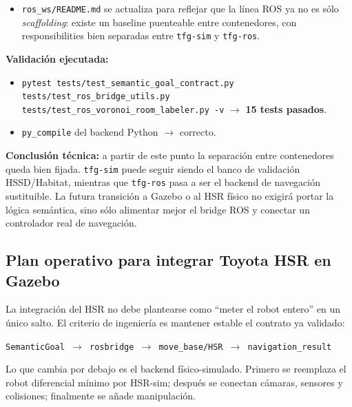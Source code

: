 \documentclass[11pt,a4paper]{article}
\begin{document}
\begin{itemize}
\begin{itemize}
                \texttt{PoseStamped};
          \item la cancelación genera el \texttt{GoalID} esperado;
          \item los resultados JSON y los resultados compatibles con
                \texttt{move\_base} se traducen al contrato
                \texttt{NavigationResult}.
        \end{itemize}
  \item \texttt{ros\_ws/README.md} se actualiza para reflejar que la línea ROS
        ya no es sólo \emph{scaffolding}: existe un baseline puenteable entre
        contenedores, con responsibilities bien separadas entre
        \texttt{tfg-sim} y \texttt{tfg-ros}.
\end{itemize}

\textbf{Validación ejecutada:}
\begin{itemize}
  \item \texttt{pytest tests/test\_semantic\_goal\_contract.py
        tests/test\_ros\_bridge\_utils.py
        tests/test\_ros\_voronoi\_room\_labeler.py -v}
        $\rightarrow$ \textbf{15 tests pasados}.
  \item \texttt{py\_compile} del backend Python $\rightarrow$ correcto.
\end{itemize}

\textbf{Conclusión técnica:} a partir de este punto la separación entre
contenedores queda bien fijada. \texttt{tfg-sim} puede seguir siendo el banco
de validación HSSD/Habitat, mientras que \texttt{tfg-ros} pasa a ser el backend
de navegación sustituible. La futura transición a Gazebo o al HSR físico no
exigirá portar la lógica semántica, sino sólo alimentar mejor el bridge ROS y
conectar un controlador real de navegación.

\subsection*{Plan operativo para integrar Toyota HSR en Gazebo}

La integración del HSR no debe plantearse como ``meter el robot entero'' en un
único salto. El criterio de ingeniería es mantener estable el contrato ya
validado:

\begin{center}
\texttt{SemanticGoal $\rightarrow$ rosbridge $\rightarrow$ move\_base/HSR $\rightarrow$ navigation\_result}
\end{center}

Lo que cambia por debajo es el backend físico-simulado. Primero se reemplaza el
robot diferencial mínimo por HSR-sim; después se conectan cámaras, sensores y
colisiones; finalmente se añade manipulación.
\end{document}
